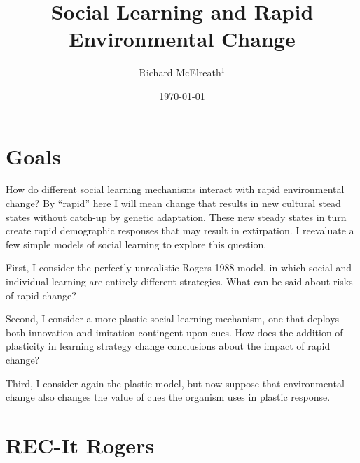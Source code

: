 \documentclass[reqno,12pt]{amsart}
\begin{document}
\title{\large Social Learning and Rapid Environmental Change}
\author[~]{Richard McElreath$^{1}$}
\address{$^1$Max Planck Institute for Evolutionary Anthropology, Deutscher Platz 6, 04103 Leipzig, Germany}
\date{\today}





\linenumbers
\modulolinenumbers[5]

\maketitle




\section{Goals}

How do different social learning mechanisms interact with rapid environmental change? By ``rapid'' here I will mean change that results in new cultural stead states without catch-up by genetic adaptation. These new steady states in turn create rapid demographic responses that may result in extirpation. I reevaluate a few simple models of social learning to explore this question.

First, I consider the perfectly unrealistic Rogers 1988 model, in which social and individual learning are entirely different strategies. What can be said about risks of rapid change?

Second, I consider a more plastic social learning mechanism, one that deploys both innovation and imitation contingent upon cues. How does the addition of plasticity in learning strategy change conclusions about the impact of rapid change?

Third, I consider again the plastic model, but now suppose that environmental change also changes the value of cues the organism uses in plastic response. 

\section{REC-It Rogers}
\end{document}
